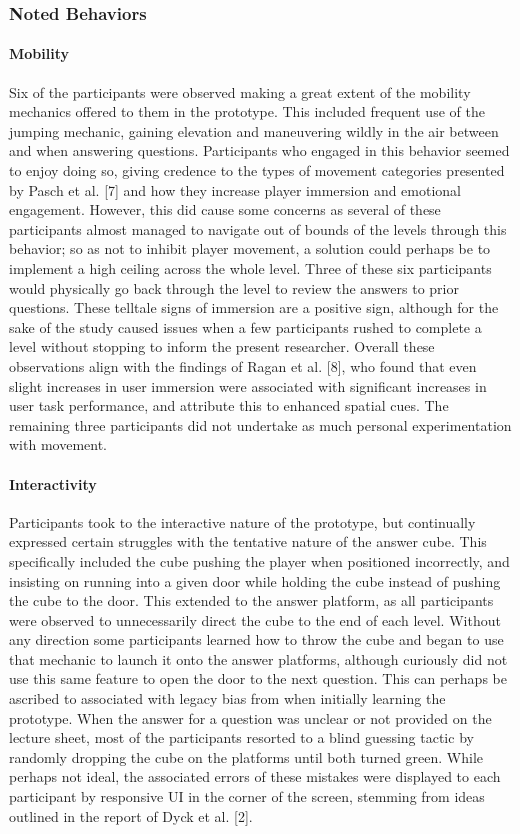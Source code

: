 \documentclass{vgtc}                          %
\begin{document}
\subsubsection{Noted Behaviors}

\paragraph{Mobility} Six of the participants were observed making a great extent of the mobility mechanics offered to them in the prototype. This included frequent use of the jumping mechanic, gaining elevation and maneuvering wildly in the air between and when answering questions. Participants who engaged in this behavior seemed to enjoy doing so, giving credence to the types of movement categories presented by Pasch et al. [7] and how they increase player immersion and emotional engagement. However, this did cause some concerns as several of these participants almost managed to navigate out of bounds of the levels through this behavior; so as not to inhibit player movement, a solution could perhaps be to implement a high ceiling across the whole level. Three of these six participants would physically go back through the level to review the answers to prior questions. These telltale signs of immersion are a positive sign, although for the sake of the study caused issues when a few participants rushed to complete a level without stopping to inform the present researcher. Overall these observations align with the findings of Ragan et al. [8], who found that even slight increases in user immersion were associated with significant increases in user task performance, and attribute this to enhanced spatial cues. The remaining three participants did not undertake as much personal experimentation with movement.

\paragraph{Interactivity} Participants took to the interactive nature of the prototype, but continually expressed certain struggles with the tentative nature of the answer cube. This specifically included the cube pushing the player when positioned incorrectly, and insisting on running into a given door while holding the cube instead of pushing the cube to the door. This extended to the answer platform, as all participants were observed to unnecessarily direct the cube to the end of each level. Without any direction some participants learned how to throw the cube and began to use that mechanic to launch it onto the answer platforms, although curiously did not use this same feature to open the door to the next question. This can perhaps be ascribed to associated with legacy bias from when initially learning the prototype. When the answer for a question was unclear or not provided on the lecture sheet, most of the participants resorted to a blind guessing tactic by randomly dropping the cube on the platforms until both turned green. While perhaps not ideal, the associated errors of these mistakes were displayed to each participant by responsive UI in the corner of the screen, stemming from ideas outlined in the report of Dyck et al. [2].
\end{document}
